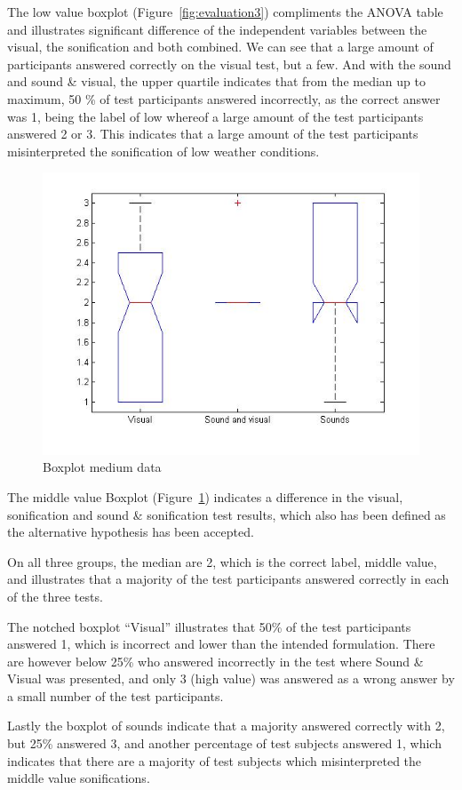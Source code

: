 The low value boxplot (Figure~\ref{fig:evaluation3}) compliments the ANOVA table and illustrates significant difference of the independent variables between the visual, the sonification and both combined.
We can see that a large amount of participants answered correctly on the visual test, but a few. And with the sound and sound \& visual, the upper quartile indicates that from the median up to maximum, 50 \% of test participants answered incorrectly, as the correct answer was 1, being the label of low whereof a large amount of the test participants answered 2 or 3.  
This indicates that a large amount of the test participants misinterpreted the sonification of low weather conditions.

\begin{figure}[!htbp]
    \centering
    \includegraphics[width=.7\textwidth]{images/Evaluation7.jpg}
    \caption{Boxplot medium data}
    \label{fig:evaluation7}
\end{figure}

The middle value Boxplot (Figure~\ref{fig:evaluation7}) indicates a difference in the visual, sonification and sound \& sonification test results, which also has been defined as the alternative hypothesis has been accepted.

On all three groups, the median are 2, which is the correct label, middle value, and illustrates that a majority of the test participants answered correctly in each of the three tests.

The notched boxplot “Visual” illustrates that 50\% of the test participants answered 1, which is incorrect and lower than the intended formulation. There are however below 25\% who answered incorrectly in the test where Sound \& Visual was presented, and only 3 (high value) was answered as a wrong answer by a small number of the test participants.

Lastly the boxplot of sounds indicate that a majority answered correctly with 2, but 25\% answered 3, and another percentage of test subjects answered 1, which indicates that there are a majority of test subjects which misinterpreted the middle value sonifications. 

